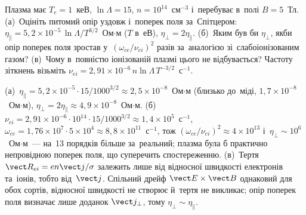 \begin{problem}\label{prb:CrossFieldResistivity}
Плазма має $T_e=1$~кеВ, $\ln\Lambda=15$, $n=10^{14}$~см$^{-3}$ і~перебуває в~полі $B=5$~Тл. (а)~Оцініть
питомий опір уздовж і~поперек поля за~Спітцером: $\eta_\parallel=5{,}2\times10^{-5}\,\ln\Lambda/T^{3/2}$~Ом$\cdot$м
($T$ в~еВ), $\eta_\perp=2\eta_\parallel$. (б)~Яким був би $\eta_\perp$, якби опір поперек поля
зростав у~$(\omega_{ce}/\nu_{ei})^2$ разів за~аналогією зі~слабоіонізованим газом? (в)~Чому в~повністю
іонізованій плазмі цього не відбувається? Частоту зіткнень візьміть $\nu_{ei}=2{,}91\times10^{-6}\,n\ln\Lambda\,T^{-3/2}$~с$^{-1}$.
	\begin{solution}
		(а)~$\eta_\parallel=5{,}2\times10^{-5}\cdot15/1000^{3/2}\approx2{,}5\times10^{-8}$~Ом$\cdot$м
		(близько до~міді, $1{,}7\times10^{-8}$~Ом$\cdot$м), $\eta_\perp=2\eta_\parallel\approx4{,}9\times10^{-8}$~Ом$\cdot$м.
		(б)~$\nu_{ei}=2{,}91\times10^{-6}\cdot10^{14}\cdot15/1000^{3/2}\approx1{,}4\times10^{5}$~с$^{-1}$,
		$\omega_{ce}=1{,}76\times10^{7}\cdot5\times10^{4}\approx8{,}8\times10^{11}$~с$^{-1}$, тож
		$(\omega_{ce}/\nu_{ei})^2\approx4\times10^{13}$ і~$\eta_\perp\sim10^{6}$~Ом$\cdot$м~--- на~13 порядків більше за~реальний; плазма
		була б практично непровідною поперек поля, що суперечить спостереженню.
		(в)~Тертя $\vect R_{ei}=en\vect j/\sigma$ залежить лише від відносної швидкості електронів та~іонів, тобто від~$\vect j$.
		Спільний дрейф $\vect E\times\vect B$ однаковий для обох сортів, відносної швидкості не створює й~тертя не викликає;
		опір поперек поля визначає лише доданок $\vect j_\perp$, тому $\eta_\perp\sim\eta_\parallel$.
	\end{solution}
\end{problem}


